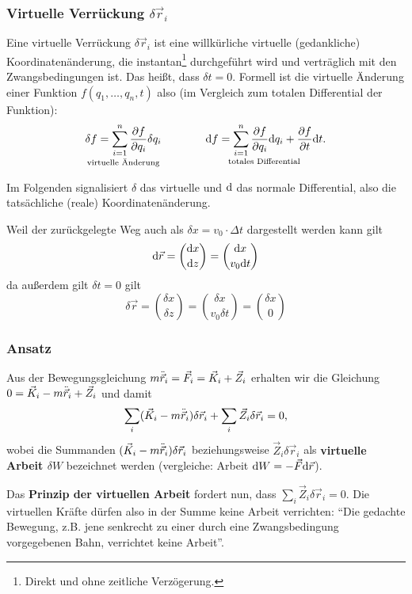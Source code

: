 \subsubsection{Virtuelle Verrückung $\delta \vec{r}_i$}
Eine virtuelle Verrückung $\delta \vec{r}_i$ ist eine willkürliche virtuelle (gedankliche) Koordinatenänderung, die instantan\footnote{Direkt und ohne zeitliche Verzögerung.} durchgeführt wird und verträglich mit den Zwangsbedingungen ist. Das heißt, dass $\delta t = 0$. Formell ist die virtuelle Änderung einer Funktion $f(q_1, \dots, q_n, t)$ also (im Vergleich zum totalen Differential der Funktion): 
\[
	\underset{\text{virtuelle Änderung}}{\delta f = \sum^n_{i = 1} \frac{\partial f}{\partial q_i} \delta q_i}
	\qquad \qquad 
	\underset{\text{totales Differential}}{\mathrm d f = \sum^n_{i = 1} \frac{\partial f}{\partial q_i} \mathrm d q_i + \frac{\partial f}{\partial t} \mathrm d t}
	\text{.}
\]

Im Folgenden signalisiert $\delta$ das virtuelle und $\mathrm d$ das normale Differential, also die tatsächliche (reale) Koordinatenänderung.

\begin{beispiel*}
Weil der zurückgelegte Weg auch als $\delta x = v_0 \cdot \Delta t$ dargestellt werden kann gilt
$$\mathrm d \vec{r} = \binom{\mathrm d x}{\mathrm d z} = \binom{\mathrm d x}{ v_0 \mathrm d t}$$
da außerdem gilt $\delta t = 0$ gilt
$$\delta \vec{r} = \binom{\delta x}{\delta z} = \binom{\delta x}{v_0 \delta t} = \binom{\delta x}{0}$$
\end{beispiel*}

\subsubsection{Ansatz}
Aus der Bewegungsgleichung $m \ddot{\vec{r}}_i = \vec{F}_i = \vec{K}_i + \vec{Z}_i$ erhalten wir die Gleichung $0 = \vec{K}_i - m \ddot{\vec{r}}_i + \vec{Z}_i$ und damit
\[
	\sum_i (\vec{K}_i - m \ddot{\vec{r}}_i) \delta \vec{r}_i + \sum_i \vec{Z}_i \delta \vec{r}_i = 0
	\text{,}
\]
wobei die Summanden $(\vec{K}_i - m \ddot{\vec{r}}_i) \delta \vec{r}_i$ beziehungsweise $\vec{Z}_i \delta \vec{r}_i$ als \textbf{virtuelle Arbeit $\delta W$} bezeichnet werden (vergleiche: Arbeit $\mathrm d W = -\vec{F} \mathrm d \vec{r}$).

Das \textbf{Prinzip der virtuellen Arbeit} fordert nun, dass $\sum_i \vec{Z}_i \delta \vec{r}_i = 0$. Die virtuellen Kräfte dürfen also in der Summe keine Arbeit verrichten: "`Die gedachte Bewegung, z.B. jene senkrecht zu einer durch eine Zwangsbedingung vorgegebenen Bahn, verrichtet keine Arbeit"'.

